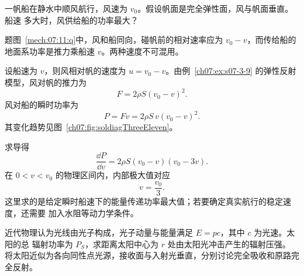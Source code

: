 {\begin{origexamplebox}{}\label{ch07:ex:s07-3-11}
一帆船在静水中顺风航行，风速为 $v_0$。假设帆面是完全弹性面，风与帆面垂直。船速
多大时，风供给船的功率最大？

\begin{qualityfigure}
\label{mech:07:11:q}
\end{qualityfigure}
\end{origexamplebox}

\begin{xesolution}题图~\ref{mech:07:11:q}中，风和船同向，碰帆前的相对速率应为 $v_0-v$，而传给船的地面系功率是推力乘船速 $v$。两种速度不可混用。

设船速为 $v$，则风相对帆的速度为 $u=v_0-v$。由例~\ref{ch07:ex:s07-3-9} 的弹性反射模型，风对帆的推力为
\[
 F=2\rho S(v_0-v)^2.
\]
风对船的瞬时功率为
\[
 P=Fv=2\rho S\,v(v_0-v)^2.
\]
其变化趋势见图~\ref{ch07:fig:soldiagThreeEleven}。

\soldiagThreeEleven
求导得
\[
 \frac{\dd P}{\dd v}=2\rho S(v_0-v)(v_0-3v).
\]
在 $0<v<v_0$ 的物理区间内，内部极大值对应
\[
 \boxed{v=\frac{v_0}{3}}.
\]
这里求的是给定瞬时船速下的能量传递功率最大值；若要确定真实航行的稳定速度，还需要
加入水阻等动力学条件。
\end{xesolution}

\begin{origexamplebox}{}\label{ch07:ex:s07-3-12}
近代物理认为光线由光子构成，光子动量与能量满足 $E=pc$，其中 $c$ 为光速。太阳的总
辐射功率为 $P_S$，求距离太阳中心为 $r$ 处由太阳光冲击产生的辐射压强。
将太阳近似为各向同性点光源，接收面与入射光垂直，分别讨论完全吸收和原路完全反射。

\begin{qualityfigure}
\label{mech:07:12:q}
\end{qualityfigure}
\end{origexamplebox}

}
